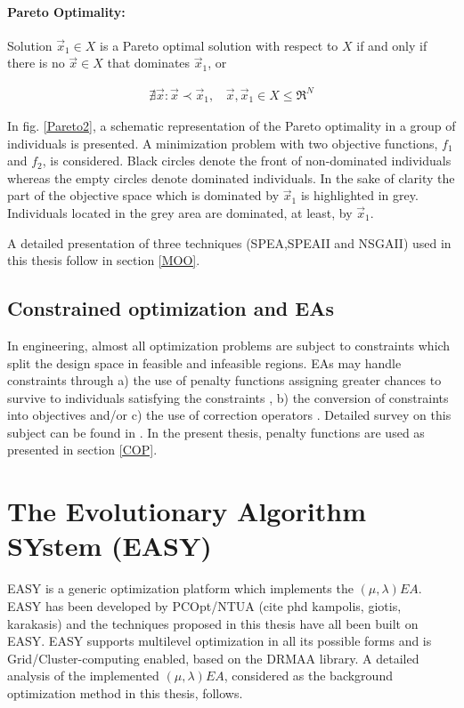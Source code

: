 \paragraph{Pareto Optimality:} Solution  $\vec{x}_1 \in X$ is a Pareto optimal solution with respect to $X$ if and only if there is no $\vec{x} \in X$ that dominates $\vec{x}_1$, or 


\begin{eqnarray}
    \nexists\vec{x}:\vec{x}\prec\vec{x}_1, ~~~~ \vec{x},\vec{x}_1\in X \!\leq\! \Re^{N}
\end{eqnarray}
 

In fig. \ref{Pareto2}, a schematic representation of the Pareto optimality in a group of individuals is presented. A minimization problem with two objective functions, $f_1$ and $f_2$, is considered. Black circles denote the front of non-dominated individuals whereas the empty circles denote dominated individuals. In the sake of clarity the part of the objective space which is dominated by $\vec{x}_1$ is highlighted in grey. Individuals located in the grey area are dominated, at least, by $\vec{x}_1$. 

A detailed presentation of three techniques (SPEA,SPEAII and NSGAII) used in this thesis follow in section \ref{MOO}.

\subsection{Constrained optimization and EAs}
\label{COPini}
In engineering, almost all optimization problems are subject to constraints which split the design space in feasible and infeasible regions. EAs may handle constraints through a) the use of penalty functions \cite{Deb00,morales98} assigning greater chances to survive to individuals satisfying the constraints \cite{powell93}, b) the conversion of constraints into objectives \cite{surry95,surry97} and/or c) the use of correction operators \cite{mich94}. Detailed survey on this subject can be found in \cite{mich96,coello02}. In the present thesis, penalty functions are used as presented in section \ref{COP}. 

\section{The Evolutionary Algorithm SYstem (EASY)}
EASY is a generic optimization platform which implements the $(\mu,\lambda)EA$. EASY has been developed by PCOpt/NTUA (cite phd kampolis, giotis, karakasis) and the techniques proposed in this thesis have all been built on EASY. EASY supports multilevel optimization in all its possible forms and is Grid/Cluster-computing enabled, based on the DRMAA library. A detailed analysis of the implemented $(\mu,\lambda)EA$, considered as the background optimization method in this thesis, follows.  


